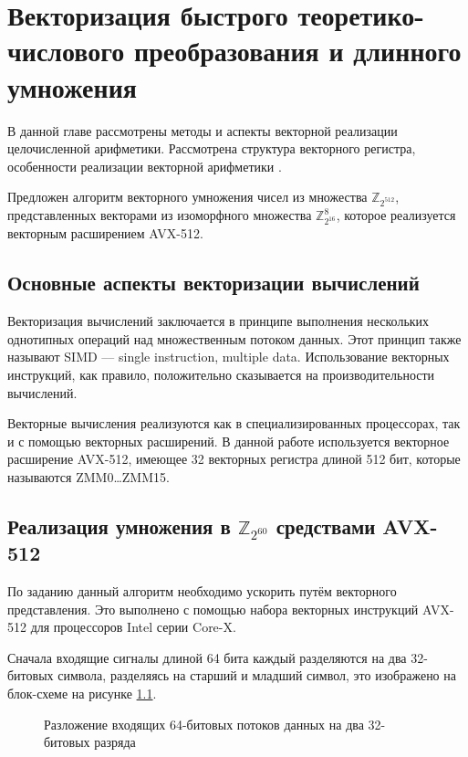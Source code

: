 \chapter{Векторизация быстрого теоретико-числового преобразования и длинного умножения}\label{chapter: implementation}
В данной главе рассмотрены методы и аспекты векторной реализации целочисленной арифметики.
Рассмотрена структура векторного регистра, особенности реализации векторной арифметики \cite{IntelManual, ArmManual}.

Предложен алгоритм векторного умножения чисел из множества $\mathbb{Z}_{2^{512}}$, представленных векторами из изоморфного множества $\mathbb{Z}_{2^{16}}^8$, которое реализуется векторным расширением AVX-512.

\section{Основные аспекты векторизации вычислений}
Векторизация вычислений заключается в принципе выполнения нескольких однотипных операций над множественным потоком данных.
Этот принцип также называют SIMD –-- single instruction, multiple data.
Использование векторных инструкций, как правило, положительно сказывается на производительности вычислений.

Векторные вычисления реализуются как в специализированных процессорах, так и с помощью векторных расширений.
В данной работе используется векторное расширение AVX-512, имеющее 32 векторных регистра длиной 512 бит, которые называются ZMM0\dots ZMM15.

\section{Реализация умножения в $\mathbb{Z}_{2^{60}}$ средствами AVX-512}
По заданию данный алгоритм необходимо ускорить путём векторного представления. Это выполнено с помощью набора векторных инструкций AVX-512 для процессоров Intel серии Core-X.

Сначала входящие сигналы длиной 64 бита каждый разделяются на два 32-битовых символа, разделяясь на старший и младший символ, это изображено на блок-схеме на рисунке \ref{eq: vector operands example}.
\begin{figure}
\centering
{}
\caption{Разложение входящих 64-битовых потоков данных на два 32-битовых разряда}
\label{eq: vector operands example}
\end{figure}

